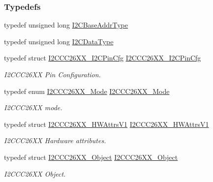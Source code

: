\subsubsection*{Typedefs}
\begin{DoxyCompactItemize}
\item 
typedef unsigned long \hyperlink{_i2_c_c_c26_x_x_8h_a6e087d828c4463de0061d8205b2245d8}{I2\+C\+Base\+Addr\+Type}
\item 
typedef unsigned long \hyperlink{_i2_c_c_c26_x_x_8h_a5c119be60e1890af18565f27bbb8433a}{I2\+C\+Data\+Type}
\item 
typedef struct \hyperlink{struct_i2_c_c_c26_x_x___i2_c_pin_cfg}{I2\+C\+C\+C26\+X\+X\+\_\+\+I2\+C\+Pin\+Cfg} \hyperlink{_i2_c_c_c26_x_x_8h_a92eeee6e19d215804204c4830a82d424}{I2\+C\+C\+C26\+X\+X\+\_\+\+I2\+C\+Pin\+Cfg}
\begin{DoxyCompactList}\small\item\em I2\+C\+C\+C26\+X\+X Pin Configuration. \end{DoxyCompactList}\item 
typedef enum \hyperlink{_i2_c_c_c26_x_x_8h_a9deb519e150efd12ccf7068efca5ee75}{I2\+C\+C\+C26\+X\+X\+\_\+\+Mode} \hyperlink{_i2_c_c_c26_x_x_8h_a8eaf242bab570cb7c90d5108c6dca937}{I2\+C\+C\+C26\+X\+X\+\_\+\+Mode}
\begin{DoxyCompactList}\small\item\em I2\+C\+C\+C26\+X\+X mode. \end{DoxyCompactList}\item 
typedef struct \hyperlink{struct_i2_c_c_c26_x_x___h_w_attrs_v1}{I2\+C\+C\+C26\+X\+X\+\_\+\+H\+W\+Attrs\+V1} \hyperlink{_i2_c_c_c26_x_x_8h_a84b33b790b23b7b5317fca113a7fb691}{I2\+C\+C\+C26\+X\+X\+\_\+\+H\+W\+Attrs\+V1}
\begin{DoxyCompactList}\small\item\em I2\+C\+C\+C26\+X\+X Hardware attributes. \end{DoxyCompactList}\item 
typedef struct \hyperlink{struct_i2_c_c_c26_x_x___object}{I2\+C\+C\+C26\+X\+X\+\_\+\+Object} \hyperlink{_i2_c_c_c26_x_x_8h_a0eb1b66d08f9584c404d1610f8282394}{I2\+C\+C\+C26\+X\+X\+\_\+\+Object}
\begin{DoxyCompactList}\small\item\em I2\+C\+C\+C26\+X\+X Object. \end{DoxyCompactList}\end{DoxyCompactItemize}
